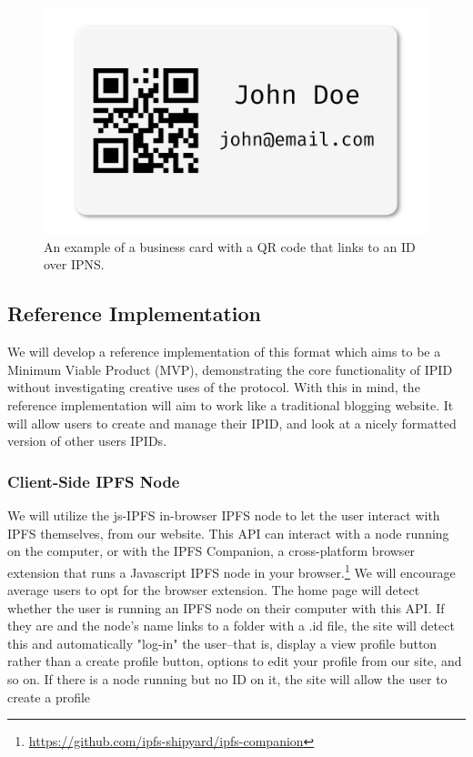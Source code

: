 \documentclass{article}
\begin{document}
\begin{figure}[h]
  \centering
  \includegraphics{resources/business_card.png}
  \caption{An example of a business card with a QR code that links to an ID over IPNS.}
\end{figure}

\subsection{Reference Implementation}

We will develop a reference implementation of this format which aims to be a Minimum Viable Product (MVP), demonstrating the core functionality of IPID without investigating creative uses of the protocol. With this in mind, the reference implementation will aim to work like a traditional blogging website. It will allow users to create and manage their IPID, and look at a nicely formatted version of other users IPIDs. 

\subsubsection{Client-Side IPFS Node}

We will utilize the js-IPFS in-browser IPFS node to let the user interact with IPFS themselves, from our website. This API can interact with a node running on the computer, or with the IPFS Companion, a cross-platform browser extension that runs a Javascript IPFS node in your browser.\footnote{\url{https://github.com/ipfs-shipyard/ipfs-companion}} We will encourage average users to opt for the browser extension. The home page will detect whether the user is running an IPFS node on their computer with this API. If they are and the node's name links to a folder with a .id file, the site will detect this and automatically "log-in" the user--that is, display a view profile button rather than a create profile button, options to edit your profile from our site, and so on. If there is a node running but no ID on it, the site will allow the user to create a profile 
\end{document}
